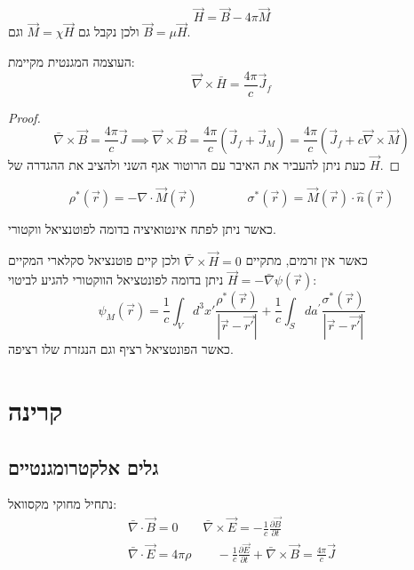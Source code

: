 \documentclass{tstextbook}
\begin{document}
\begin{definition}
$$\vec{H}=\vec{B}-4\pi\vec{M}$$
ולכן נקבל גם \(\vec{M}=\chi \vec{H}\) וגם \(\vec{B}=\mu \vec{H}\).

\end{definition}
\begin{proposition}
העוצמה המגנטית מקיימת:
$$\vec{\nabla}\times \bar{H}=\frac{4\pi}{c}\vec{J}_{f}$$

\end{proposition}
\begin{proof}
$$\bar{\nabla} \times \vec{B} =\frac{4\pi}{c}\vec{J}\implies\vec{\nabla}\times\vec{B}={\frac{4\pi}{c}}\left(\vec{J}_{f}+\vec{J}_{M}\right)={\frac{4\pi}{c}}\left(\vec{J}_{f}+c\vec{\nabla}\times\vec{M}\right)$$
כעת ניתן להעביר את האיבר עם הרוטור אגף השני ולהציב את ההגדרה של \(\vec{H}\).

\end{proof}
\begin{definition}
$$\rho^{*}(\vec{r})=-\nabla\cdot\vec{M}(\vec{r})\qquad\qquad\sigma^{*}(\vec{r})=\vec{M}(\vec{r})\cdot\hat{n}(\vec{r})$$

\end{definition}
כאשר ניתן לפתח אינטואיציה בדומה לפוטנציאל ווקטורי.

\begin{proposition}
כאשר אין זרמים, מתקיים \(\bar{\nabla} \times \vec{H}=0\) ולכן קיים פוטנציאל סקלארי המקיים \(\vec{H}=-\bar{\nabla}\psi\left( \vec{r} \right)\) ניתן בדומה לפונטציאל הווקטורי להגיע לביטוי:
$$\psi_{M}(\vec{r})=\frac{1}{c}\int_{V}d^{3}x'\frac{\rho^{*}(\vec{r})}{|\vec{r}-\vec{r'}|}+\frac{1}{c}\int_{S}d a^{\prime}\frac{\sigma^{*}(\vec{r})}{|\vec{r}-\vec{r'}|}$$
כאשר הפונטציאל רציף וגם הנגזרת שלו רציפה.

\end{proposition}
\chapter{קרינה}

\section{גלים אלקטרומגנטיים}

נתחיל מחוקי מקסוואל:
\begin{gather*} \bar{\nabla} \cdot \vec{B} = 0 \qquad \bar{\nabla} \times \vec{E} = -\frac{1}{c} \frac{\partial \vec{B}}{\partial t} \\\bar{\nabla} \cdot \vec{E}=4\pi \rho \qquad -\frac{1}{c}\frac{\partial \vec{E}}{\partial t} + \bar{\nabla} \times \vec{B} = \frac{4\pi}{c}\vec{J} 
\end{gather*}
\end{document}

